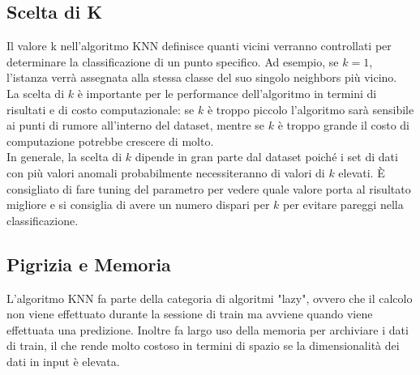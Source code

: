 		\subsection{Scelta di K}
			Il valore k nell'algoritmo KNN definisce quanti vicini verranno controllati per determinare la classificazione di un punto specifico.
			Ad esempio, se $k = 1$, l'istanza verrà assegnata alla stessa classe del suo singolo neighbors più vicino.
			\\[2\baselineskip]
			La scelta di $k$ è importante per le performance dell'algoritmo in termini di risultati e di costo computazionale: se $k$ è troppo piccolo l'algoritmo sarà sensibile ai punti di rumore all'interno del dataset, mentre se $k$ è troppo grande il costo di computazione potrebbe crescere di molto.
			\\[1\baselineskip]
			In generale, la scelta di $k$ dipende in gran parte dal dataset poiché i set di dati con più valori anomali probabilmente necessiteranno di valori di $k$ elevati.
			È consigliato di fare tuning del parametro per vedere quale valore porta al risultato migliore e si consiglia di avere un numero dispari per $k$ per evitare pareggi nella classificazione.

		\subsection{Pigrizia e Memoria}
			L'algoritmo KNN fa parte della categoria di algoritmi "lazy", ovvero che il calcolo non viene effettuato durante la sessione di train ma avviene quando viene effettuata una predizione.
			Inoltre fa largo uso della memoria per archiviare i dati di train, il che rende molto costoso in termini di spazio se la dimensionalità dei dati in input è elevata.
\clearpage